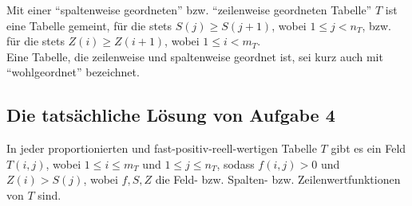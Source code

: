 Mit einer "`spaltenweise geordneten"' bzw. "`zeilenweise geordneten Tabelle"' $T$ ist eine Tabelle gemeint, für die 
stets $S(j) \geq S(j+1)$, wobei $1 \leq j < n_T$, bzw. für die stets $Z(i) \geq Z(i+1)$, wobei $1 \leq i < m_T$.\\
Eine Tabelle, die zeilenweise und spaltenweise geordnet ist, sei kurz auch mit "`wohlgeordnet"' bezeichnet.\\

\subsection*{Die tatsächliche Lösung von Aufgabe 4}

\begin{thm}\label{haupt4}
    In jeder proportionierten und fast-positiv-reell-wertigen Tabelle $T$ gibt es ein Feld $T(i, j)$, wobei $1 \leq 
    i \leq m_T$ und $1 \leq j \leq n_T$, sodass $f(i, j) > 0$ und $Z(i) > S(j)$, wobei $f, S, Z$ die Feld- bzw. Spalten- 
    bzw. Zeilenwertfunktionen von $T$ sind.
\end{thm}

